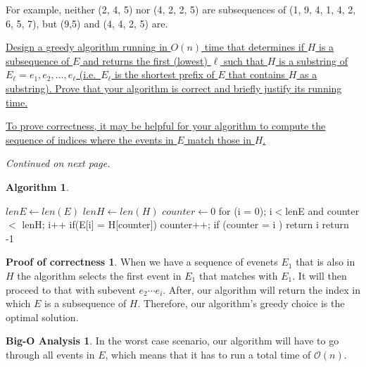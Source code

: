 \documentclass[11pt]{article}
\theoremstyle{definition}
\newtheorem*{algo}{Algorithm}
\newtheorem*{proofcorr}{Proof of correctness}
\newtheorem*{analysis}{Big-O Analysis}
\begin{document}
\begin{enumerate}
For example, neither (2, 4, 5) nor (4, 2, 2, 5) are subsequences of 
(1, 9, 4, 1, 4, 2, 6, 5, 7), but (9,5) and (4, 4, 2, 5) are.

\uline{
Design a greedy algorithm running in $O(n)$ time that determines if $H$ is a subsequence of $E$ and returns
the first (lowest) $\ell$ such that $H$ is a substring of $E_\ell = e_1, e_2, \ldots, e_\ell$ 
(i.e.~$E_{\ell}$ is the shortest prefix of $E$ that contains $H$ as a substring).
Prove that your algorithm is correct and briefly justify its running time.
}

\uline{
To prove correctness, it may be helpful for your algorithm to compute the sequence of indices where
the events in $E$ match those in $H$.
}

\textit{Continued on next page.}
\newpage
\begin{algo}
	\item
	\begin{algorithmic}[1]
		\State $lenE \leftarrow len(E)$
		\State $lenH \leftarrow len(H)$
		\State $counter \leftarrow 0$
		\State for (i = 0); i$<$lenE and counter $<$ lenH; i++
		\State if(E[i] = H[counter]) 
		\State counter++;
		\State if (counter = i )
		\State return i
		\State return -1
		\EndProcedure
	\end{algorithmic}
\end{algo}
\newpage
\begin{proofcorr}
	\item
When we have a sequence of evenets $E_1$ that is also in $H$ the algorithm selects the first event in $E_1$ that matches with $E_1$. It will 
then proceed to that with subevent $e_2 \cdots e_i$. After, our algorithm will return the index in which $E$ is a subsequence of $H$. Therefore, 
our algorithm's greedy choice is the optimal solution. 
\end{proofcorr}
\newpage
\begin{analysis}
In the worst case scenario, our algorithm will have to go through all events in $E$, which means that it has to run a total time of $\mathcal{O}(n)$.
\end{analysis}
\newpage

\end{enumerate} 
\end{document}
